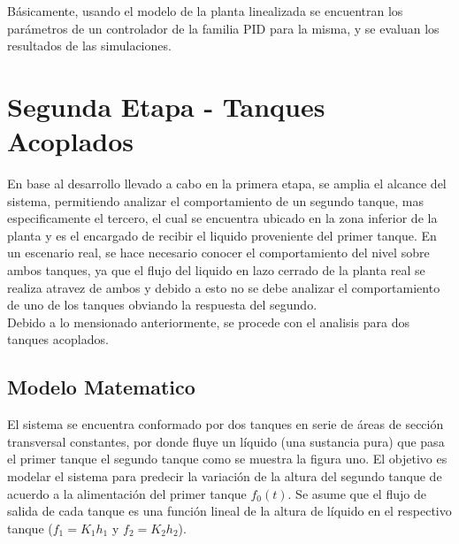 \documentclass[a4paper,12pt,twoside]{proyectotanquesecci}
\begin{document}

Básicamente, usando el modelo de la planta linealizada se encuentran los parámetros de un controlador de la familia PID para la misma, y se evaluan los resultados de las simulaciones.




\section{Segunda Etapa - Tanques Acoplados}

En base al desarrollo llevado a cabo en la primera etapa, se amplia el alcance del sistema, permitiendo analizar el comportamiento de un segundo tanque, mas especificamente el tercero, el cual se encuentra ubicado en la zona inferior de la planta y es el encargado de recibir el liquido proveniente del primer tanque. En un escenario real, se hace necesario conocer el comportamiento del nivel sobre ambos tanques, ya que el flujo del liquido en lazo cerrado de la planta real se realiza atravez de ambos y debido a esto no se debe analizar el comportamiento de uno de los tanques obviando la respuesta del segundo. \\

Debido a lo mensionado anteriormente, se procede con el analisis para dos tanques acoplados.

\subsection{Modelo Matematico}

El sistema se encuentra conformado por dos tanques en serie de áreas de sección transversal constantes, por donde fluye un líquido (una sustancia pura) que pasa el primer tanque el segundo tanque como se muestra la figura uno. El objetivo es modelar el sistema para predecir la variación de la altura del segundo tanque de acuerdo a la alimentación del primer tanque $f_{0}(t)$. Se asume que el flujo de salida de cada tanque es una función lineal de la altura de líquido en el respectivo tanque ($f_{1}=K_{1}h_{1}$ y $f_{2}=K_{2}h_{2}$).
\end{document}
